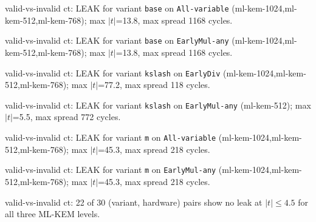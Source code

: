 \item valid-vs-invalid ct: LEAK for variant \texttt{base} on \texttt{All-variable} (ml-kem-1024,ml-kem-512,ml-kem-768); max $|t|$=13.8, max spread 1168 cycles.
\item valid-vs-invalid ct: LEAK for variant \texttt{base} on \texttt{EarlyMul-any} (ml-kem-1024,ml-kem-512,ml-kem-768); max $|t|$=13.8, max spread 1168 cycles.
\item valid-vs-invalid ct: LEAK for variant \texttt{kslash} on \texttt{EarlyDiv} (ml-kem-1024,ml-kem-512,ml-kem-768); max $|t|$=77.2, max spread 118 cycles.
\item valid-vs-invalid ct: LEAK for variant \texttt{kslash} on \texttt{EarlyMul-any} (ml-kem-512); max $|t|$=5.5, max spread 772 cycles.
\item valid-vs-invalid ct: LEAK for variant \texttt{m} on \texttt{All-variable} (ml-kem-1024,ml-kem-512,ml-kem-768); max $|t|$=45.3, max spread 218 cycles.
\item valid-vs-invalid ct: LEAK for variant \texttt{m} on \texttt{EarlyMul-any} (ml-kem-1024,ml-kem-512,ml-kem-768); max $|t|$=45.3, max spread 218 cycles.
\item valid-vs-invalid ct: 22 of 30 (variant, hardware) pairs show no leak at $|t|\le4.5$ for all three ML-KEM levels.
